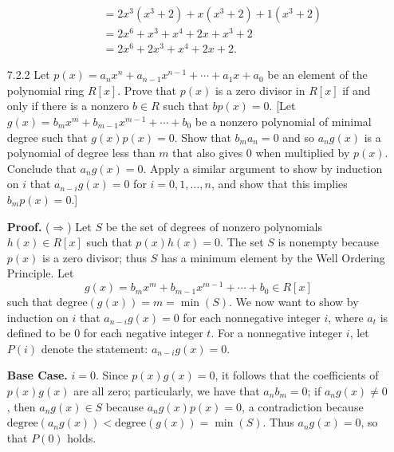 \begin{enumerate}
\begin{enumerate}
\begin{align*}
                           &= 2x^3(x^3 + 2) + x(x^3 + 2) + 1(x^3 + 2)  \\
                           &= 2x^6 + x^3 + x^4 + 2x + x^3 + 2 \\
                           &= 2x^6 + 2x^3 + x^4 + 2x + 2.
               \end{align*}
      \end{enumerate}
   \item[7.2.2]   Let $p(x) = a_nx^n + a_{n-1}x^{n-1}+\cdots+a_1x+a_0$ be an
                  element of the polynomial ring $R[x]$. Prove that $p(x)$ is a
                  zero divisor in $R[x]$ if and only if there is a nonzero 
                  $b \in R$ such that $bp(x) = 0$. [Let $g(x) = b_mx^m +
                  b_{m-1}x^{m-1} + \cdots + b_0$ be a nonzero polynomial of
                  minimal degree such that $g(x)p(x) = 0$. Show that
                  $b_ma_n = 0$ and so $a_ng(x)$ is a polynomial of degree less
                  than $m$ that also gives 0 when multiplied by $p(x)$. Conclude
                  that $a_ng(x) = 0$. Apply a similar argument to show by
                  induction on $i$ that $a_{n-i}g(x) = 0$ for
                  $i = 0, 1, \ldots, n$, and show that this implies
                  $b_mp(x) = 0$.]

      \textbf{Proof.} ($\Rightarrow$) Let $S$ be the set of degrees of nonzero
      polynomials $h(x) \in R[x]$ such that $p(x)h(x) = 0$. The set $S$ is
      nonempty because $p(x)$ is a zero divisor; thus $S$ has a minimum element
      by the Well Ordering Principle. Let
      $$g(x) = b_mx^m + b_{m-1}x^{m-1} + \cdots + b_0 \in R[x]$$
      such that degree$(g(x)) = m = \min(S)$. We now want to show by induction
      on $i$ that $a_{n-i}g(x) = 0$ for each nonnegative integer $i$, where
      $a_t$ is defined to be 0 for each negative integer $t$. For a nonnegative
      integer $i$, let $P(i)$ denote the statement: $a_{n-i}g(x) = 0$.

      \textbf{Base Case.} $i = 0$. Since $p(x)g(x) = 0$, it follows that the
      coefficients of $p(x)g(x)$ are all zero; particularly, we have that
      $a_nb_m = 0$; if $a_ng(x) \neq 0$, then $a_ng(x) \in S$ because
      $a_ng(x)p(x) = 0$, a contradiction because
      $\text{degree}(a_ng(x)) < \text{degree}(g(x)) = \min(S)$.
      Thus $a_ng(x) = 0$, so that $P(0)$ holds.


\end{enumerate}
